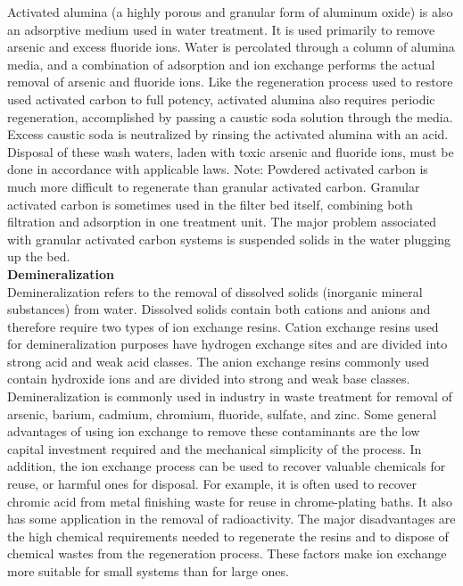 \documentclass{article}
\begin{document}
Activated alumina (a highly porous and granular form of aluminum oxide) is also an adsorptive medium used in water treatment. It is used primarily to remove arsenic and excess fluoride ions. Water is percolated through a column of alumina media, and a combination of adsorption and ion exchange performs the actual removal of arsenic and fluoride ions. Like the regeneration process used to restore used activated carbon to full potency, activated alumina also requires periodic regeneration, accomplished by passing a caustic soda solution through the media. Excess caustic soda is neutralized by rinsing the activated alumina with an acid. Disposal of these wash waters, laden with toxic arsenic and fluoride ions, must be done in accordance with applicable laws.
Note: Powdered activated carbon is much more difficult to regenerate than granular activated carbon. Granular activated carbon is sometimes used in the filter bed itself, combining both filtration and adsorption in one treatment unit. The major problem associated with granular activated carbon systems is suspended solids in the water plugging up the bed.\\
 

\textbf{Demineralization}\\
Demineralization refers to the removal of dissolved solids (inorganic mineral substances) from water. Dissolved solids contain both cations and anions and therefore require two types of ion exchange resins. Cation exchange resins used for demineralization purposes have hydrogen exchange sites and are divided into strong acid and weak acid classes. The anion exchange resins commonly used contain hydroxide ions and are divided into strong and weak base classes. Demineralization is commonly used in industry in waste treatment for removal of arsenic, barium, cadmium, chromium, fluoride, sulfate, and zinc. Some general advantages of using ion exchange to remove these contaminants are the low capital investment required and the mechanical simplicity of the process. In addition, the ion exchange process can be used to recover valuable chemicals for reuse, or harmful ones for disposal. For example, it is often used to recover chromic acid from metal finishing waste for reuse in chrome-plating baths. It also has some application in the removal of radioactivity. The major disadvantages are the high chemical requirements needed to regenerate the resins and to dispose of chemical wastes from the regeneration process. These factors make ion exchange more suitable for small systems than for large ones.\\
\end{document}
